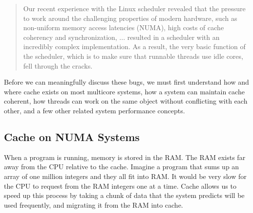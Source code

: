 \documentclass{sig-alternate}
\begin{document}
\begin{quote}
Our recent experience with the Linux scheduler revealed that the pressure to work around the challenging properties of modern hardware, such as non-uniform memory access latencies (NUMA), high costs of cache coherency and synchronization, ... resulted in a scheduler with an incredibly complex implementation. As a result, the very basic function of the scheduler, which is to make sure that runnable threads use idle cores, fell through the cracks.~\cite{Lozi:2016}
\end{quote}

Before we can meaningfully discuss these bugs, we must first understand how and where cache exists on most multicore systems, how a system can maintain cache coherent, how threads can work on the same object without conflicting with each other, and a few other related system performance concepts.



\subsection{Cache on NUMA Systems}
\label{sec:cache}

When a program is running, memory is stored in the RAM. The RAM exists far away from the CPU relative to the cache. Imagine a program that sums up an array of one million integers and they all fit into RAM. It would be very slow for the CPU to request from the RAM integers one at a time. Cache allows us to speed up this process by taking a chunk of data that the system predicts will be used frequently, and migrating it from the RAM into cache.
\end{document}
